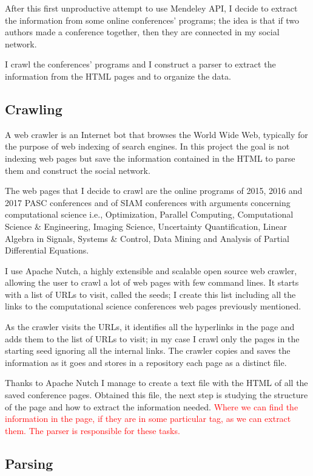 \documentclass[]{usiinfbachelorproject}
\begin{document}
After this first unproductive attempt to use Mendeley API, I decide to  extract the information from some online conferences' programs; the idea is that if two authors made a conference together, then they are connected in my social network.

I crawl the conferences' programs and I construct a parser to extract the information from the HTML pages and  to organize the data.

\subsection{Crawling}

A web crawler is an Internet bot that browses the World Wide Web, typically for the purpose of web indexing of search engines. In this project the goal is not indexing web pages but save the information contained in the HTML to parse them and construct the social network.

The web pages that I decide to crawl are the online programs of 2015, 2016 and 2017 PASC conferences and of SIAM conferences with arguments concerning computational science i.e., Optimization, Parallel Computing, Computational Science \& Engineering, Imaging Science, Uncertainty Quantification, Linear Algebra in Signals, Systems \& Control, Data Mining and Analysis of Partial Differential Equations.

I use Apache Nutch, a highly extensible and scalable open source web crawler, allowing the user to crawl a lot of web pages with few command lines.
It starts with a list of URLs to visit, called the seeds; I create this list including all the links to the computational science conferences web pages previously mentioned.

As the crawler visits the URLs, it identifies all the hyperlinks in the page and adds them to the list of URLs to visit; in my case I crawl only the pages in the starting seed ignoring all the internal links. The crawler copies and saves the information as it goes and stores in a repository each page as a distinct file.

Thanks to Apache Nutch I manage to create a text file with the HTML of all the saved conference pages. Obtained this file, the next step is studying the structure of the page and how to extract the information needed. \textcolor{red}{Where we can find the information in the page, if they are in some particular tag, as we can extract them. The parser is responsible for these tasks.}

\subsection{Parsing}
\end{document}
